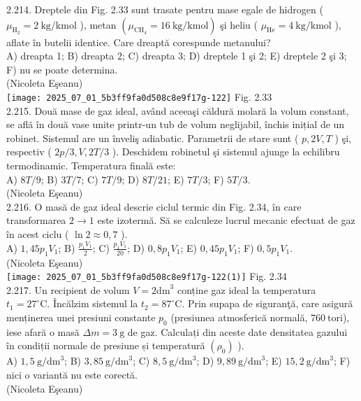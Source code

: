 2.214. Dreptele din Fig. 2.33 sunt trasate pentru mase egale de hidrogen ( $\mu_{\mathrm{H}_{2}}=2 \mathrm{~kg} / \mathrm{kmol}$ ), metan $\left(\mu_{\mathrm{CH}_{4}}=16 \mathrm{~kg} / \mathrm{kmol}\right)$ şi heliu ( $\mu_{\mathrm{He}}=4 \mathrm{~kg} / \mathrm{kmol}$ ), aflate în butelii identice. Care dreaptă corespunde metanului?\\ A) dreapta 1; B) dreapta 2; C) dreapta 3; D) dreptele 1 şi 2; E) dreptele 2 şi 3; F) nu se poate determina.\\ (Nicoleta Eşeanu)\\ \texttt{[image: 2025\_07\_01\_5b3ff9fa0d508c8e9f17g-122]} Fig. 2.33\\

2.215. Două mase de gaz ideal, având aceeaşi căldură molară la volum constant, se află în două vase unite printr-un tub de volum neglijabil, închis inițial de un robinet. Sistemul are un înveliş adiabatic. Parametrii de stare sunt ( $p, 2 V, T$ ) şi, respectiv ( $2 p / 3, V, 2 T / 3$ ). Deschidem robinetul şi sistemul ajunge la echilibru termodinamic. Temperatura finală este:\\ A) $8 T / 9$; B) $3 T / 7$; C) $7 T / 9$; D) $8 T / 21$; E) $7 T / 3$; F) $5 T / 3$.\\ (Nicoleta Eşeanu)\\

2.216. O masă de gaz ideal descrie ciclul termic din Fig. 2.34, în care transformarea $2 \rightarrow 1$ este izotermă. Să se calculeze lucrul mecanic efectuat de gaz în acest ciclu ( $\ln 2 \approx 0,7$ ).\\ A) $1,45 p_{1} V_{1}$; B) $\frac{p_{1} V_{1}}{2}$; C) $\frac{p_{1} V_{1}}{20}$; D) $0,8 p_{1} V_{1}$; E) $0,45 p_{1} V_{1}$; F) $0,5 p_{1} V_{1}$.\\ (Nicoleta Eşeanu)\\ \texttt{[image: 2025\_07\_01\_5b3ff9fa0d508c8e9f17g-122(1)]} Fig. 2.34\\

2.217. Un recipient de volum $V=2 \mathrm{dm}^{3}$ conține gaz ideal la temperatura $t_{1}=27^{\circ} \mathrm{C}$. Încălzim sistemul la $t_{2}=87^{\circ} \mathrm{C}$. Prin supapa de siguranţă, care asigură menținerea unei presiuni constante $p_{0}$ (presiunea atmosferică normală, $760 \mathrm{~tori}$), iese afară o masă $\Delta m=3 \mathrm{~g}$ de gaz. Calculați din aceste date densitatea gazului în condiții normale de presiune și temperatură $\left(\rho_{0}\right)$ ).\\ A) $1,5 \mathrm{~g} / \mathrm{dm}^{3}$; B) $3,85 \mathrm{~g} / \mathrm{dm}^{3}$; C) $8,5 \mathrm{~g} / \mathrm{dm}^{3}$; D) $9,89 \mathrm{~g} / \mathrm{dm}^{3}$; E) $15,2 \mathrm{~g} / \mathrm{dm}^{3}$; F) nici o variantă nu este corectă.\\ (Nicoleta Eşeanu)\\

